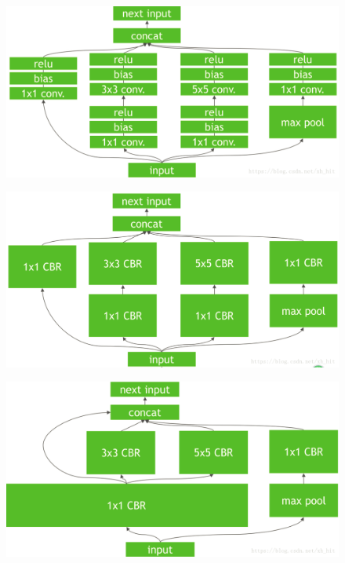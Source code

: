 \begin{figure}
\centering
\includegraphics{./img/ch17/tensorRT1.png}
\caption{}
\end{figure}

\begin{figure}
\centering
\includegraphics{./img/ch17/tensorRT2.png}
\caption{}
\end{figure}

\begin{figure}
\centering
\includegraphics{./img/ch17/tensorRT3.png}
\caption{}
\end{figure}

